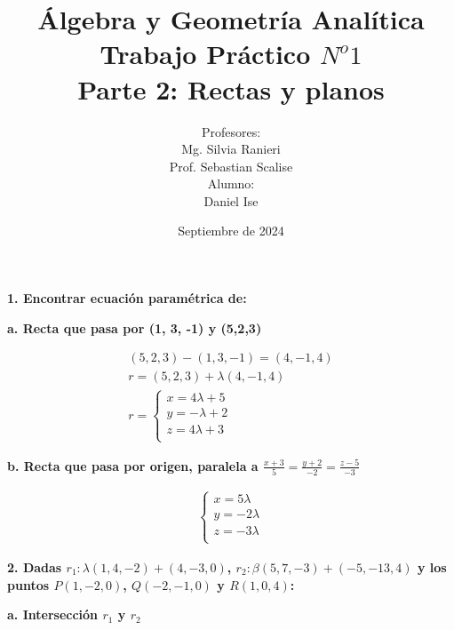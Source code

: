 \documentclass{article}
\title{Álgebra y Geometría Analítica\\ Trabajo Práctico $N^o1$\\Parte 2: Rectas y planos}
\author{Profesores:\\Mg. Silvia Ranieri\\Prof. Sebastian Scalise\\Alumno:\\Daniel Ise}
\date{Septiembre de 2024}
\begin{document}
\maketitle

\textbf{1. Encontrar ecuación paramétrica de:}

\textbf{a. Recta que pasa por (1, 3, -1) y (5,2,3)}

\begin{align*}
    (5,2,3) - (1,3,-1) = (4, -1, 4) \\
    r = (5,2,3) + \lambda (4,-1,4)  \\
    r =
    \begin{cases}
        x = 4 \lambda + 5 \\
        y = - \lambda + 2 \\
        z = 4 \lambda + 3 \\
    \end{cases}
\end{align*}

\textbf{b. Recta que pasa por origen, paralela a \(\frac{x+3}{5} = \frac{y+2}{-2} = \frac{z-5}{-3}\)}

\begin{align*}
    \begin{cases}
        x = 5 \lambda  \\
        y = -2 \lambda \\
        z = -3 \lambda \\
    \end{cases}
\end{align*}

\textbf{2. Dadas \(r_1: \lambda (1,4,-2) + (4,-3,0)\),
    \(r_2: \beta (5,7,-3) + (-5,-13,4)\) y
    los puntos \(P (1,-2,0)\), \(Q (-2,-1,0)\) y \(R(1,0,4)\):}

\textbf{a. Intersección \(r_1\) y \(r_2\)}
\end{document}
